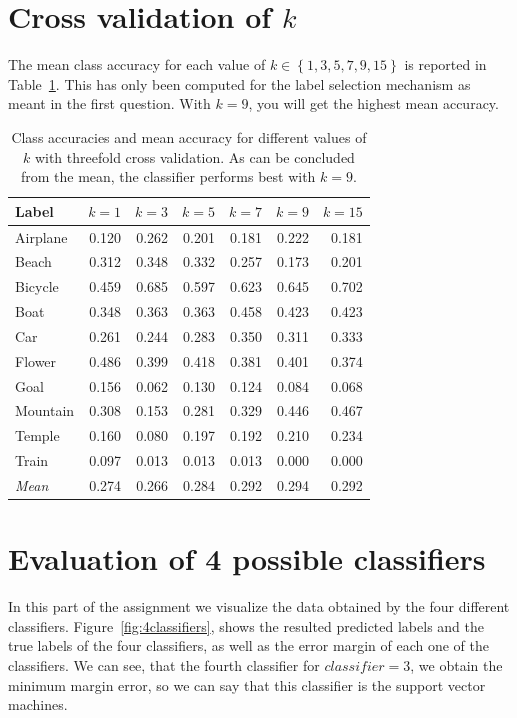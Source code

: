 \documentclass[a4paper,10pt]{article}
\begin{document}
\section{Cross validation of $k$}
The mean class accuracy for each value of $k \in \left\{1, 3, 5, 7, 9, 15\right\}$ is reported in Table~\ref{t:crossacc}.  This has only been computed for the label selection mechanism as meant in the first question.  With $k=9$, you will get the highest mean accuracy.

\begin{table}
  \centering
  \begin{tabular}{l|rrrrrr}
    Label &  $k=1$ &  $k=3$ &  $k=5$ &  $k=7$ &  $k=9$ &  $k=15$ \\
    \hline
    Airplane  & 0.120  & 0.262  & 0.201  & 0.181  & 0.222  & 0.181 \\
       Beach  & 0.312  & 0.348  & 0.332  & 0.257  & 0.173  & 0.201 \\
     Bicycle  & 0.459  & 0.685  & 0.597  & 0.623  & 0.645  & 0.702 \\
        Boat  & 0.348  & 0.363  & 0.363  & 0.458  & 0.423  & 0.423 \\
         Car  & 0.261  & 0.244  & 0.283  & 0.350  & 0.311  & 0.333 \\
      Flower  & 0.486  & 0.399  & 0.418  & 0.381  & 0.401  & 0.374 \\
        Goal  & 0.156  & 0.062  & 0.130  & 0.124  & 0.084  & 0.068 \\
    Mountain  & 0.308  & 0.153  & 0.281  & 0.329  & 0.446  & 0.467 \\
      Temple  & 0.160  & 0.080  & 0.197  & 0.192  & 0.210  & 0.234 \\
       Train  & 0.097  & 0.013  & 0.013  & 0.013  & 0.000  & 0.000 \\
    \hline
  \emph{Mean} & 0.274  & 0.266  & 0.284  & 0.292  & 0.294  & 0.292 \\
  \end{tabular}
  \caption{Class accuracies and mean accuracy for different values of $k$ with threefold cross validation.  As can be concluded from the mean, the classifier performs best with $k=9$.}
  \label{t:crossacc}
\end{table}

\section{Evaluation of 4 possible classifiers}
In this part of the assignment we visualize the data obtained by the four different classifiers. Figure~\ref{fig:4classifiers}, shows the resulted predicted labels and the true labels of the four classifiers, as well as the error margin of each one of the classifiers. We can see, that the fourth classifier for $classifier = 3$, we obtain the minimum margin error, so we can say that this classifier is the support vector machines.
\end{document}
